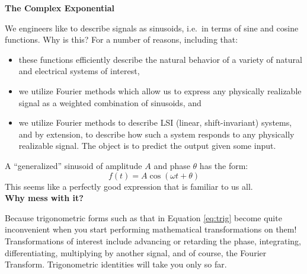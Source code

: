 
%




\setcounter{page}{1}
\setcounter{equation}{0}
\setcounter{figure}{0}
\begin{center}
\Large{\textbf{The Complex Exponential}}
\normalsize

\end{center}


We engineers like to describe signals as sinusoids, i.e.\
in terms of sine and cosine functions.  Why is this? 
For a number of reasons, including that:
\begin{itemize}
\item these functions efficiently describe the natural behavior
of a variety of natural and electrical systems of interest,
\item we utilize Fourier methods which allow us to express
any physically realizable signal as a weighted combination of sinusoids, and
\item we utilize Fourier methods to describe LSI (linear,
shift-invariant) systems, and by extension, to describe how such a
system responds to any physically realizable signal. The object is to
predict the output given some input.
\end{itemize}
A ``generalized'' sinusoid of amplitude $A$ and phase $\theta$ has the form:
\begin{equation}
f(t) = A \cos(\omega t + \theta)
\label{eq:trig}
\end{equation}
This seems like a perfectly good expression that is familiar to us
all.\\

\textbf{Why mess with it?} 

Because trigonometric forms such as that in Equation \ref{eq:trig}
become quite inconvenient when you start performing mathematical
transformations on them! Transformations of interest include advancing
or retarding the phase, integrating, differentiating, multiplying by
another signal, and of course, the Fourier Transform. Trigonometric
identities will take you only so far.

